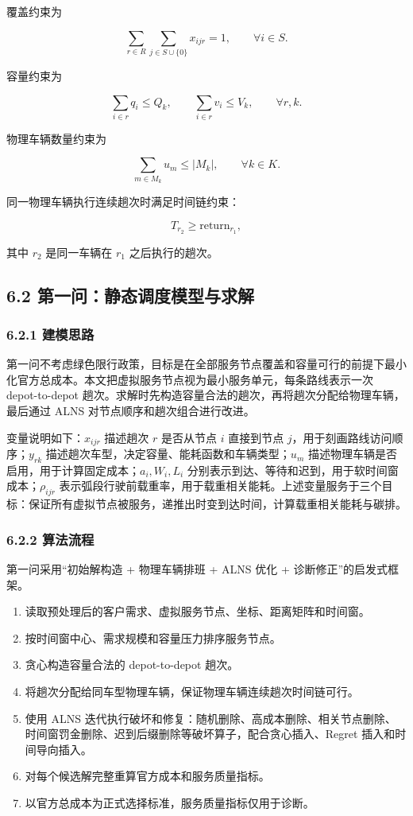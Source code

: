 \documentclass[UTF8,zihao=-4,a4paper]{ctexart}
\begin{document}
覆盖约束为

\[
\sum_{r\in R}\sum_{j\in S\cup\{0\}}x_{ijr}=1,\qquad \forall i\in S.
\]

容量约束为

\[
\sum_{i\in r}q_i\le Q_k,\qquad \sum_{i\in r}v_i\le V_k,\qquad \forall r,k.
\]

物理车辆数量约束为

\[
\sum_{m\in M_k}u_m\le |M_k|,\qquad \forall k\in K.
\]

同一物理车辆执行连续趟次时满足时间链约束：

\[
T_{r_2}\ge \mathrm{return}_{r_1},
\]

其中 \(r_2\) 是同一车辆在 \(r_1\) 之后执行的趟次。

\subsection{6.2 第一问：静态调度模型与求解}

\subsubsection{6.2.1 建模思路}

第一问不考虑绿色限行政策，目标是在全部服务节点覆盖和容量可行的前提下最小化官方总成本。本文把虚拟服务节点视为最小服务单元，每条路线表示一次 depot-to-depot 趟次。求解时先构造容量合法的趟次，再将趟次分配给物理车辆，最后通过 ALNS 对节点顺序和趟次组合进行改进。

变量说明如下：\(x_{ijr}\) 描述趟次 \(r\) 是否从节点 \(i\) 直接到节点 \(j\)，用于刻画路线访问顺序；\(y_{rk}\) 描述趟次车型，决定容量、能耗函数和车辆类型；\(u_m\) 描述物理车辆是否启用，用于计算固定成本；\(a_i,W_i,L_i\) 分别表示到达、等待和迟到，用于软时间窗成本；\(\rho_{ijr}\) 表示弧段行驶前载重率，用于载重相关能耗。上述变量服务于三个目标：保证所有虚拟节点被服务，递推出时变到达时间，计算载重相关能耗与碳排。

\subsubsection{6.2.2 算法流程}

第一问采用“初始解构造 + 物理车辆排班 + ALNS 优化 + 诊断修正”的启发式框架。

\begin{enumerate}[leftmargin=2em,itemsep=0.2em]
\item 读取预处理后的客户需求、虚拟服务节点、坐标、距离矩阵和时间窗。
\item 按时间窗中心、需求规模和容量压力排序服务节点。
\item 贪心构造容量合法的 depot-to-depot 趟次。
\item 将趟次分配给同车型物理车辆，保证物理车辆连续趟次时间链可行。
\item 使用 ALNS 迭代执行破坏和修复：随机删除、高成本删除、相关节点删除、时间窗罚金删除、迟到后缀删除等破坏算子，配合贪心插入、Regret 插入和时间导向插入。
\item 对每个候选解完整重算官方成本和服务质量指标。
\item 以官方总成本为正式选择标准，服务质量指标仅用于诊断。
\end{enumerate}
\end{document}
